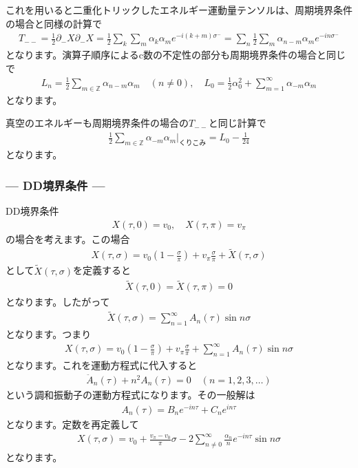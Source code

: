 \documentclass[report,paper=a4, fontsize=12pt, line_length=16cm, number_of_lines=34,dvipdfmx]{jlreq}
\numberwithin{equation}{chapter}
\numberwithin{equation}{section}
\newcommand{\Zb}{\mathbb{Z}}
\newcommand{\del}{\partial}
\begin{document}
これを用いると二重化トリックしたエネルギー運動量テンソルは、周期境界条件の場合と同様の計算で
\begin{align}
  T_{--}=\frac12 \del_{-}X\del_{-}X
  =\frac12 \sum_{k}\sum_{m}\alpha_{k}\alpha_{m}e^{-i(k+m)\sigma^{-}}
  =\sum_{n}\frac12\sum_{m}\alpha_{n-m}\alpha_{m}e^{-in\sigma^{-}}
\end{align}
となります。演算子順序によるc数の不定性の部分も周期境界条件の場合と同じで
\begin{align}
  L_{n}=\frac12\sum_{m\in\Zb}\alpha_{n-m}\alpha_{m} \quad (n\ne 0),\quad
  L_{0}=\frac12 \alpha_{0}^2+\sum_{m=1}^{\infty}\alpha_{-m}\alpha_{m}
\end{align}
となります。

真空のエネルギーも周期境界条件の場合の$T_{--}$と同じ計算で
\begin{align}
  \frac12\sum_{m\in\Zb}\alpha_{-m}\alpha_{m}\Bigg|_{\text{くりこみ}}=L_{0}-\frac{1}{24}
\end{align}
となります。

\subsubsection*{--- DD境界条件 ---}
DD境界条件
\begin{align}
  X(\tau,0)=v_0,\quad X(\tau,\pi)=v_{\pi}
\end{align}
の場合を考えます。この場合
\begin{align}
  X(\tau,\sigma)=v_{0}\left( 1-\frac{\sigma}{\pi} \right)+v_{\pi}\frac{\sigma}{\pi}+\widetilde{X}(\tau,\sigma)
\end{align}
として$\widetilde{X}(\tau,\sigma)$を定義すると
\begin{align}
  \widetilde{X}(\tau,0)=\widetilde{X}(\tau,\pi)=0
\end{align}
となります。したがって
\begin{align}
  \widetilde{X}(\tau,\sigma)=\sum_{n=1}^{\infty}A_{n}(\tau)\sin n\sigma
\end{align}
となります。つまり
\begin{align}
  X(\tau,\sigma)=v_{0}\left( 1-\frac{\sigma}{\pi} \right)+v_{\pi}\frac{\sigma}{\pi}+\sum_{n=1}^{\infty}A_{n}(\tau)\sin n\sigma
\end{align}
となります。これを運動方程式に代入すると
\begin{align}
  \ddot{A}_{n}(\tau)+n^2 A_{n}(\tau)=0 \quad (n=1,2,3,\dots)
\end{align}
という調和振動子の運動方程式になります。その一般解は
\begin{align}
  A_{n}(\tau)=B_{n}e^{-in\tau}+C_{n}e^{in\tau}
\end{align}
となります。定数を再定義して
\begin{align}
  X(\tau,\sigma)=v_{0}+\frac{v_{\pi}-v_{0}}{\pi}\sigma-2\sum_{n\ne 0}^{\infty}\frac{\alpha_{n}}{n}e^{-in\tau}\sin n\sigma
\end{align}
となります。
\end{document}
